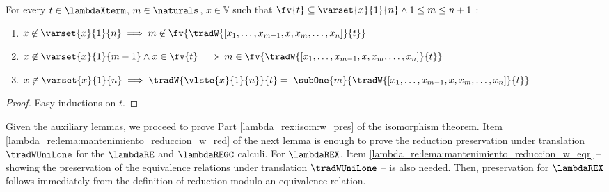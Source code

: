 \begin{lemma}\label{lambda_regc:lema:w_gc}
For every $t \in \lambdaXterm$, $m \in \naturals$, $x \in \mathbb{V}$ such that $\fv{t} \subseteq \varset{x}{1}{n} \land 1 \leq m \leq n+1$ :
    \vspace{-.07cm}
    \begin{enumerate}
        \item \label{lambda_regc:lema:w_gc:not} $x \not\in \varset{x}{1}{n} \implies m \not\in \fv{\tradW{\left[
        x_1, \ldots, x_{m-1}, x, x_m, \ldots, x_n \right]}{t}}$

        \item \label{lambda_regc:lema:w_gc:in} $x \not\in \varset{x}{1}{m-1} \land x \in \fv{t} \implies
        m \in \fv{\tradW{\left[ x_1, \ldots, x_{m-1}, x, x_m, \ldots, x_n
        \right]}{t}}$

        \item \label{lambda_regc:lema:w_gc:dec} $x \not\in \varset{x}{1}{n} \implies \tradW{\vlste{x}{1}{n}}{t} =
        \; \subOne{m}{\tradW{\left[ x_1, \ldots, x_{m-1}, x, x_m, \ldots, x_n
        \right]}{t}}$
    \end{enumerate}
    \begin{proof}
    \vspace{-.07cm}
    Easy inductions on $t$.
    \end{proof}
\end{lemma}

Given the auxiliary lemmas, we proceed to prove Part
\ref{lambda_rex:isom:w_pres} of the isomorphism theorem. Item
\ref{lambda_re:lema:mantenimiento_reduccion_w_red}
of the next lemma is enough to prove the reduction preservation under
translation $\tradWUniLone$ for the $\lambdaRE$ and $\lambdaREGC$ calculi. For
$\lambdaREX$, Item \ref{lambda_re:lema:mantenimiento_reduccion_w_eqr}
-- showing the preservation of the equivalence relations under
translation $\tradWUniLone$ -- is also needed. Then, preservation for
$\lambdaREX$ follows immediately from the definition of reduction modulo an
equivalence relation.

